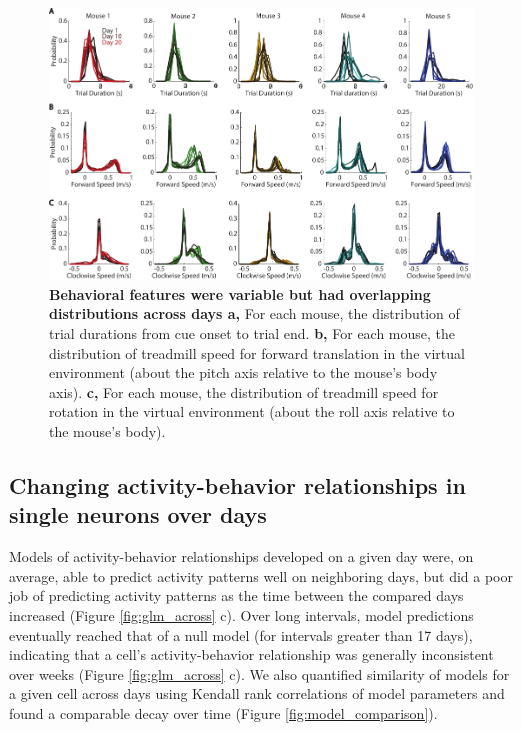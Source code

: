 \begin{figure}
\includegraphics[width=\textwidth]{figures/4_distribution_filters.pdf}
\caption[Behavioral features were variable but had overlapping distributions across days]{\textbf{Behavioral features were variable but had overlapping distributions across days a,} For each mouse, the distribution of trial durations from cue onset to trial end. 
%
\textbf{b,} For each mouse, the distribution of treadmill speed for forward translation in the virtual environment (about the pitch axis relative to the mouse's body axis). 
%
\textbf{c,} For each mouse, the distribution of treadmill speed for rotation in the virtual environment (about the roll axis relative to the mouse's body).
\label{fig:4_distribution_filters}}
\end{figure}

\subsection{Changing activity-behavior relationships in single neurons over days} \label{sec:chap3_activity_behave_relation}

Models of activity-behavior relationships developed on a given day were, on average, able to predict activity patterns well on neighboring days, but did a poor job of predicting activity patterns as the time between the compared days increased (Figure \ref{fig:glm_across} c). Over long intervals, model predictions eventually reached that of a null model (for intervals greater than 17 days), indicating that a cell's activity-behavior relationship was generally inconsistent over weeks (Figure \ref{fig:glm_across} c). We also quantified similarity of models for a given cell across days using Kendall rank correlations of model parameters and found a comparable decay over time (Figure \ref{fig:model_comparison}). 

